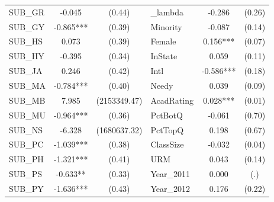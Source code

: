 \begin{table}[htb]
\begin{threeparttable}
\begin{tabular}{l c c|l c c }
    \cline{4-6}
    SUB\_GR                                      & -0.045                     & (0.44)               & \_lambda            & -0.286                 & (0.26)               \\
    SUB\_GY                                      & -0.865***                  & (0.39)               & Minority            & -0.087                 & (0.14)               \\
    SUB\_HS                                      & 0.073                      & (0.39)               & Female              & 0.156***               & (0.07)               \\
    SUB\_HY                                      & -0.395                     & (0.34)               & InState             & 0.059                  & (0.11)               \\
    SUB\_JA                                      & 0.246                      & (0.42)               & Intl                & -0.586***              & (0.18)               \\
    SUB\_MA                                      & -0.784***                  & (0.40)               & Needy               & 0.039                  & (0.09)               \\
    SUB\_MB                                      & 7.985                      & (2153349.47)         & AcadRating          & 0.028***               & (0.01)               \\
    SUB\_MU                                      & -0.964***                  & (0.36)               & PctBotQ             & -0.061                 & (0.70)               \\
    SUB\_NS                                      & -6.328                     & (1680637.32)         & PctTopQ             & 0.198                  & (0.67)               \\
    SUB\_PC                                      & -1.039***                  & (0.38)               & ClassSize           & -0.032                 & (0.04)               \\
    SUB\_PH                                      & -1.321***                  & (0.41)               & URM                 & 0.043                  & (0.14)               \\
    SUB\_PS                                      & -0.633**                   & (0.33)               & Year\_2011       & 0.000                  & (.)                  \\
    SUB\_PY                                      & -1.636***                  & (0.43)               & Year\_2012               & 0.176                  & (0.22)               \\

\end{tabular}
\end{threeparttable}
\end{table}
